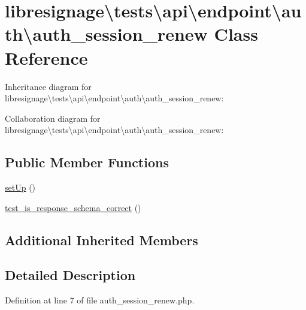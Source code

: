 \hypertarget{classlibresignage_1_1tests_1_1api_1_1endpoint_1_1auth_1_1auth__session__renew}{}\section{libresignage\textbackslash{}tests\textbackslash{}api\textbackslash{}endpoint\textbackslash{}auth\textbackslash{}auth\+\_\+session\+\_\+renew Class Reference}
\label{classlibresignage_1_1tests_1_1api_1_1endpoint_1_1auth_1_1auth__session__renew}


Inheritance diagram for libresignage\textbackslash{}tests\textbackslash{}api\textbackslash{}endpoint\textbackslash{}auth\textbackslash{}auth\+\_\+session\+\_\+renew\+:


Collaboration diagram for libresignage\textbackslash{}tests\textbackslash{}api\textbackslash{}endpoint\textbackslash{}auth\textbackslash{}auth\+\_\+session\+\_\+renew\+:
\subsection*{Public Member Functions}
\begin{DoxyCompactItemize}
\item 
\hyperlink{classlibresignage_1_1tests_1_1api_1_1endpoint_1_1auth_1_1auth__session__renew_a304b56b248a4752e5689e2494c04644d}{set\+Up} ()
\item 
\hyperlink{classlibresignage_1_1tests_1_1api_1_1endpoint_1_1auth_1_1auth__session__renew_a00e00c2e09972d1bf8febb95dbc34b4b}{test\+\_\+is\+\_\+response\+\_\+schema\+\_\+correct} ()
\end{DoxyCompactItemize}
\subsection*{Additional Inherited Members}


\subsection{Detailed Description}


Definition at line 7 of file auth\+\_\+session\+\_\+renew.\+php.



